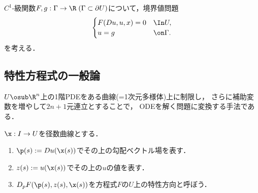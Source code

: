 \documentclass[uplatex,dvipdfmx]{jsreport}
\begin{document}
\begin{problem}
    $C^1$-級関数$F,g:\Gamma\to\R\;(\Gamma\subset\partial U)$について，境界値問題
    \begin{equation}\label{eq-5-2}
        \begin{cases}
            F(Du,u,x)=0&\In U,\\
            u=g&\on\Gamma.
        \end{cases}
    \end{equation}
    を考える．
\end{problem}

\subsection{特性方程式の一般論}

\begin{tcolorbox}[colframe=ForestGreen, colback=ForestGreen!10!white,breakable,colbacktitle=ForestGreen!40!white,coltitle=black,fonttitle=\bfseries\sffamily,
title=]
    $U\osub\R^n$上の1階PDEをある曲線(=1次元多様体)上に制限し，
    さらに補助変数を増やして$2n+1$元連立とすることで，
    ODEを解く問題に変換する手法である．
\end{tcolorbox}

\begin{notation}
    $\x:I\to U$を径数曲線とする．
    \begin{enumerate}
        \item $\p(s):=Du(\x(s))$でその上の勾配ベクトル場を表す．
        \item $z(s):=u(\x(s))$でその上の$u$の値を表す．
        \item $D_pF(\p(s),z(s),\x(s))$を方程式$F$の$U$上の特性方向と呼ぼう．
    \end{enumerate}
\end{notation}
\end{document}
